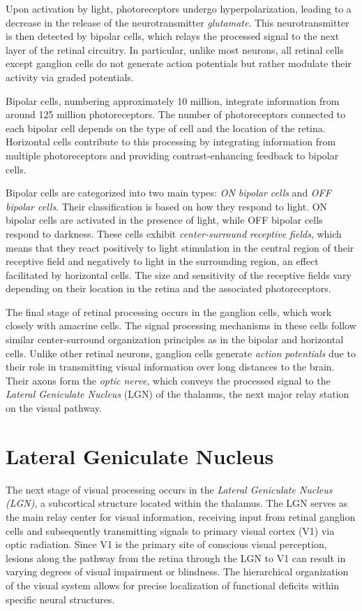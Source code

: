 Upon activation by light, photoreceptors undergo hyperpolarization, leading to a decrease
in the release of the neurotransmitter \emph{glutamate}. This neurotransmitter is then
detected by bipolar cells, which relays the processed signal to the next layer of the
retinal circuitry. In particular, unlike most neurons, all retinal cells except ganglion
cells do not generate action potentials but rather modulate their activity via graded potentials.

Bipolar cells, numbering approximately 10 million, integrate information from around
125 million photoreceptors. The number of photoreceptors connected to each bipolar
cell depends on the type of cell and the location of the retina. Horizontal cells contribute 
to this processing by integrating information from multiple photoreceptors and
providing contrast-enhancing feedback to bipolar cells.

Bipolar cells are categorized into two main types: \emph{ON bipolar cells} 
and \emph{OFF bipolar cells}. Their classification is based on how they 
respond to light. ON bipolar cells are activated in the presence of light, 
while OFF bipolar cells respond to darkness. These cells exhibit
\emph{center-surround receptive fields}, which means that they react positively to light
stimulation in the central region of their receptive field and negatively to
light in the surrounding region, an effect facilitated by horizontal cells. 
The size and sensitivity of the receptive fields vary depending on their location in the retina and the associated photoreceptors.

The final stage of retinal processing occurs in the ganglion cells, 
which work closely with amacrine cells. The signal processing mechanisms
in these cells follow similar center-surround organization principles as in
the bipolar and horizontal cells. Unlike other retinal neurons, ganglion
cells generate \emph{action potentials} due to their role in transmitting
visual information over long distances to the brain. Their axons form the
\emph{optic nerve}, which conveys the processed signal to the
\emph{Lateral Geniculate Nucleus} (LGN) of the thalamus, the next major relay
station on the visual pathway.

\section{Lateral Geniculate Nucleus}
\label{sec:lgn}
The next stage of visual processing occurs in the \emph{Lateral Geniculate Nucleus (LGN)}, 
a subcortical structure located within the thalamus. The LGN serves as the main relay center
for visual information, receiving input from retinal ganglion cells and
subsequently transmitting signals to primary visual cortex (V1) via optic radiation. 
Since V1 is the primary site of conscious visual perception, lesions along the pathway from the
retina through the LGN to V1 can result in varying degrees of visual impairment or blindness. 
The hierarchical organization of the visual system allows for precise localization of functional
deficits within specific neural structures.

